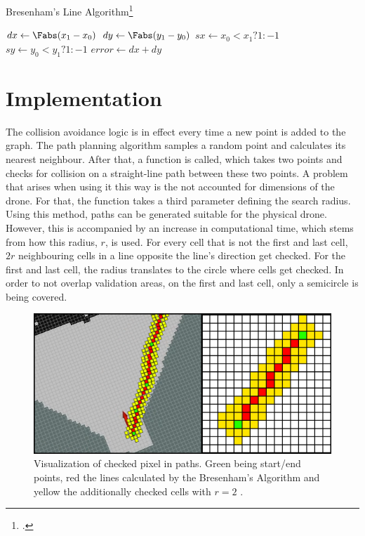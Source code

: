 \begin{algorithm}[]
	\caption{Bresenham's Line Algorithm\footcite{Zingl2012}}
	$dx \gets \Fabs(x_1-x_0)$\;
	$dy \gets \Fabs(y_1-y_0)$\;
	$sx \gets x_0<x_1 ? 1 : -1$\;
	$sy \gets y_0<y_1 ? 1 : -1$\;
	$error \gets dx + dy$\;
\end{algorithm}



\section{Implementation}
The collision avoidance logic is in effect every time a new point is added to the graph. The path planning algorithm samples a random point and calculates its nearest neighbour. After that, a function is called, which takes two points and checks for collision on a straight-line path between these two points.\newline
A problem that arises when using it this way is the not accounted for dimensions of the drone. For that, the function takes a third parameter defining the search radius. Using this method, paths can be generated suitable for the physical drone. However, this is accompanied by an increase in computational time, which stems from how this radius, $r$, is used. For every cell that is not the first and last cell, $2r$ neighbouring cells in a line opposite the line's direction get checked. For the first and last cell, the radius translates to the circle where cells get checked. In order to not overlap validation areas, on the first and last cell, only a semicircle is being covered. 

\begin{figure}[h]
	\centering
	\includegraphics[width=0.8\linewidth]{img/CheckedPixels}
	\caption{Visualization of checked pixel in paths. Green being start/end points, red the lines calculated by the Bresenham's Algorithm and yellow the additionally checked cells with $r = 2$ .}
	\label{fig:collision_detection_checkedPixels}
\end{figure}

